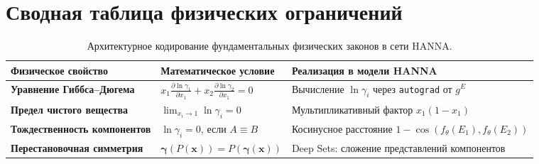 \documentclass[12pt,a4paper]{article}
\begin{document}
\section{Сводная таблица физических ограничений}

\begin{table}[htbp]
\centering
\scriptsize
\begin{tabularx}{\textwidth}{@{}>{\raggedright\arraybackslash}p{}>{\raggedright\arraybackslash}X>{\raggedright\arraybackslash}p{}@{}}
\toprule
\textbf{Физическое свойство} & \textbf{Математическое условие} & \textbf{Реализация в модели HANNA} \\ \midrule
\textbf{Уравнение Гиббса--Дюгема} & $x_1 \frac{\partial \ln \gamma_1}{\partial x_1} + x_2 \frac{\partial \ln \gamma_2}{\partial x_1} = 0$ & Вычисление $\ln \gamma_i$ через \texttt{autograd} от $g^E$ \\
\addlinespace
\textbf{Предел чистого вещества} & $\lim_{x_i \to 1} \ln \gamma_i = 0$ & Мультипликативный фактор $x_1(1 - x_1)$ \\
\addlinespace
\textbf{Тождественность компонентов} & $\ln \gamma_i = 0$, если $A \equiv B$ & Косинусное расстояние $1 - \cos(f_\theta(E_1), f_\theta(E_2))$ \\
\addlinespace
\textbf{Перестановочная симметрия} & $\boldsymbol{\gamma}(P(\mathbf{x})) = P(\boldsymbol{\gamma}(\mathbf{x}))$ & Deep Sets: сложение представлений компонентов \\
\bottomrule
\end{tabularx}
\caption{Архитектурное кодирование фундаментальных физических законов в сети HANNA.}
\end{table}
\end{document}
